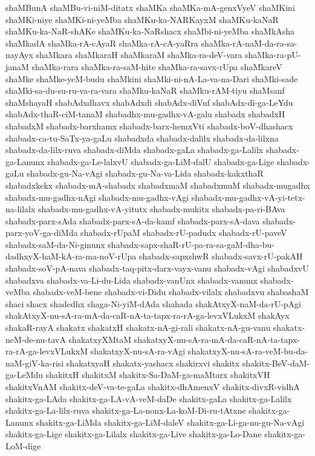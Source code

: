 {shaMBunA
shaMBu-vi-niM-ditatx
shaMKa
shaMKa-mA-genxVyeV
shaMKini
shaMKi-niye
shaMKi-ni-yeMba
shaMKu-ka-NARKayxM
shaMKu-kaNaR
shaMKu-ka-NaR-shAKe
shaMKu-ka-NaRshacx
shaMbi-ni-yeMba
shaMkAsha
shaMkadA
shaMka-rA-cAyaR
shaMka-rA-cA-yaRra
shaMka-rA-naM-da-ra-sa-nayAyx
shaMkara
shaMkaraH
shaMkaraM
shaMka-ra-deV-vara
shaMka-ra-pU-janaM
shaMka-rara
shaMka-ra-saM-hite
shaMka-ra-savx-rUpa
shaMkareV
shaMke
shaMke-yeM-budu
shaMkini
shaMki-ni-nA-La-va-na-Dari
shaMki-sade
shaMki-sa-du-su-ru-va-ra-vara
shaMku-kaNaR
shaMku-rAM-tiyu
shaMsanf
shaMshayaH
shabAdxdhavx
shabAdxdi
shabAdx-diVnf
shabAdx-di-ga-LeYdu
shabAdx-thaR-ciM-tanaM
shabadhx-mu-gadhx-vA-galu
shabadx
shabadxH
shabadxM
shabadx-barxhamx
shabadx-barx-hemxVti
shabadx-boV-dhashacx
shabadx-ca-tu-SaTx-ya-gaLu
shabadxda
shabadx-dalilx
shabadx-da-lilxna
shabadx-da-lilx-ruva
shabadx-diMda
shabadx-gaLa
shabadx-ga-Lalilx
shabadx-ga-Lanunx
shabadx-ga-Le-lalxvU
shabadx-ga-LiM-dalU
shabadx-ga-Lige
shabadx-gaLu
shabadx-gu-Na-vAgi
shabadx-gu-Na-va-Lida
shabadx-kakxthaR
shabadxkekx
shabadx-mA-shabadx
shabadxmaM
shabadxmuM
shabadx-mugadhx
shabadx-mu-gadhx-nAgi
shabadx-mu-gadhx-vAgi
shabadx-mu-gadhx-vA-yi-tetx-na-lilalx
shabadx-mu-gadhx-vA-yitutx
shabadx-mukitx
shabadx-pa-ri-BAva
shabadx-parx-sAda
shabadx-parx-sA-da-kamf
shabadx-parx-sA-dava
shabadx-parx-yoV-ga-diMda
shabadx-rUpaM
shabadx-rU-padudx
shabadx-rU-paveV
shabadx-saM-da-Ni-ginunx
shabadx-sapx-shaR-rU-pa-ra-sa-gaM-dha-bu-dadhxyX-haM-kA-ra-ma-noV-rUpa
shabadx-sapxshwR
shabadx-savx-rU-pakAH
shabadx-soV-pA-nava
shabadx-taq-pitx-darx-vayx-vanu
shabadx-vAgi
shabadxvU
shabadxva
shabadx-va-Li-du-Lida
shabadx-vanUnx
shabadx-vanunx
shabadx-veMba
shabadx-veM-bene
shabadx-vi-Didu
shabadx-vilalx
shabadxvu
shabashaM
shaci
shacx
shadedhx
shaga-Ni-yiM-dAda
shahada
shakAtxyX-naM-da-rU-pAgi
shakAtxyX-nu-sA-ra-mA-da-caR-nA-ta-tapx-ra-rA-ga-levxVLukxM
shakAyx
shakaR-rayA
shakatx
shakatxH
shakatx-nA-gi-rali
shakatx-nA-gu-vanu
shakatx-neM-de-nu-tavA
shakatxyXMtaM
shakatxyX-nu-sA-ra-mA-da-caR-nA-ta-tapx-ra-rA-ga-levxVLukxM
shakatxyX-nu-sA-ra-vAgi
shakatxyX-nu-sA-ra-veM-bu-da-naM-giV-ka-risi
shakatxyaH
shakatx-yashacx
shakirxvi
shakitx
shakitx-BeV-daM-ga-LeMdu
shakitxH
shakitxM
shakitx-Sa-DaM-ga-maMtarx
shakitxVH
shakitxVnAM
shakitx-deV-va-te-gaLa
shakitx-dhAmenxV
shakitx-divxR-vidhA
shakitx-ga-LAda
shakitx-ga-LA-vA-veM-daDe
shakitx-gaLa
shakitx-ga-Lalilx
shakitx-ga-La-lilx-ruva
shakitx-ga-La-nonx-La-koM-Di-ru-tAtxne
shakitx-ga-Lanunx
shakitx-ga-LiMda
shakitx-ga-LiM-daleV
shakitx-ga-Li-ga-nu-gu-Na-vAgi
shakitx-ga-Lige
shakitx-ga-Lilalx
shakitx-ga-Live
shakitx-ga-Lo-Dane
shakitx-ga-LoM-dige
}
